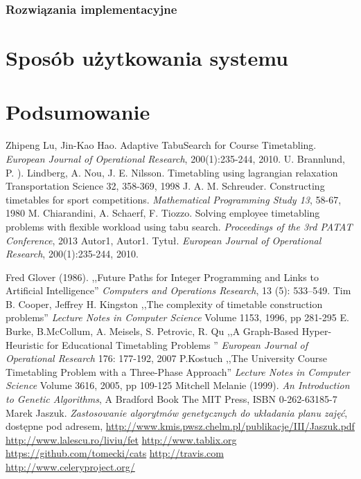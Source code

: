 \documentclass[11pt]{report}
\begin{document}
\subsection{Rozwiązania implementacyjne}



\chapter{Sposób użytkowania systemu}
\chapter{Podsumowanie}

\begin{thebibliography}{2}
 Zhipeng Lu, Jin-Kao Hao. Adaptive TabuSearch for Course Timetabling.  \emph{European Journal of Operational Research}, 200(1):235-244, 2010.
 U. Brannlund, P. ). Lindberg, A. Nou, J. E. Nilsson. Timetabling using lagrangian relaxation Transportation Science 32, 358-369, 1998
 J. A. M. Schreuder. Constructing timetables for sport competitions. \emph{Mathematical Programming Study 13}, 58-67, 1980
 M. Chiarandini, A. Schaerf, F. Tiozzo. Solving employee timetabling problems with flexible workload using tabu search. \emph{Proceedings of the 3rd PATAT Conference}, 2013
 Autor1, Autor1. Tytuł.  \emph{European Journal of Operational Research}, 200(1):235-244, 2010.

 Fred Glover (1986). ,,Future Paths for Integer Programming and Links to Artificial Intelligence'' \emph{Computers and Operations Research}, 13 (5): 533–549.
 Tim B. Cooper, Jeffrey H. Kingston ,,The complexity of timetable construction problems''  \emph{Lecture Notes in Computer Science} Volume 1153, 1996, pp 281-295 
  E. Burke, B.McCollum, A. Meisels, S. Petrovic, R. Qu ,,A Graph-Based Hyper-Heuristic for Educational Timetabling Problems '' \emph{European Journal of Operational Research} 176: 177-192, 2007
 P.Kostuch ,,The University Course Timetabling Problem with a Three-Phase Approach'' \emph{
Lecture Notes in Computer Science} Volume 3616, 2005, pp 109-125
 Mitchell Melanie (1999). \emph{An Introduction to Genetic Algorithms}, A Bradford Book The MIT Press, ISBN 0-262-63185-7
 Marek Jaszuk. \emph{Zastosowanie algorytmów genetycznych do układania planu zajęć}, dostępne pod adresem, \url{http://www.kmis.pwsz.chelm.pl/publikacje/III/Jaszuk.pdf}
 \url{http://www.lalescu.ro/liviu/fet}
 \url{http://www.tablix.org}
 \url{https://github.com/tomecki/cats}
 \url{http://travis.com}
 \url{http://www.celeryproject.org/}
\end{thebibliography}
\end{document}
